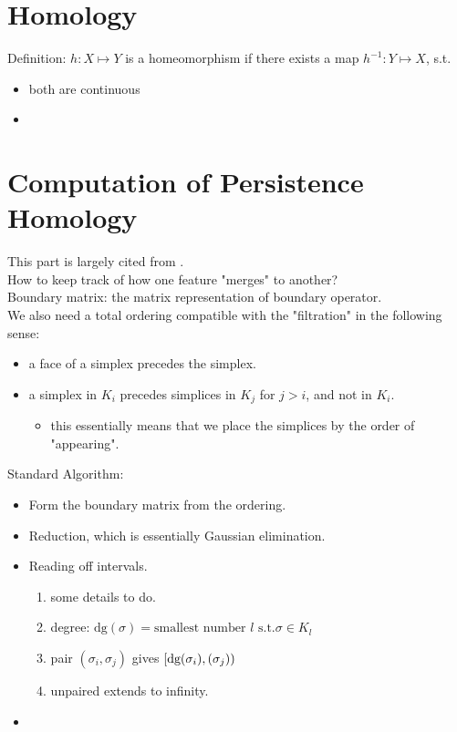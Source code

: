 \documentclass[10pt,a4paper]{article}
\begin{document}
\section{Homology}
Definition: $h:X\mapsto Y$ is a homeomorphism if there exists a map $h^{-1}:Y\mapsto X$, s.t.
\begin{itemize}
	\item both are continuous
	\item
\end{itemize}



\section{Computation of Persistence Homology}
This part is largely cited from \cite{Otter2017}.\\
How to keep track of how one feature "merges" to another?\\
Boundary matrix: the matrix representation of boundary operator.\\
We also need a total ordering compatible with the "filtration" in the following sense:
\begin{itemize}
	\item a face of a simplex precedes the simplex.
	\item a simplex in $K_i$ precedes simplices in $K_j$ for $j>i$, and not in $K_i$.
	\begin{itemize}
		\item this essentially means that we place the simplices by the order of "appearing".
	\end{itemize}
\end{itemize}

Standard Algorithm:
\begin{itemize}
	\item Form the boundary matrix from the ordering.
	\item Reduction, which is essentially Gaussian elimination.
	\item Reading off intervals.
	\begin{enumerate}
		\item some details to do.
		\item degree: $\text{dg}(\sigma)=\text{smallest number }l\text{ s.t.}\sigma\in K_l$
		\item pair $(\sigma_i,\sigma_j)$ gives $[\text{dg}(\sigma_i),\text(\sigma_j))$
		\item unpaired extends to infinity.
	\end{enumerate}
	\item 
\end{itemize}
\end{document}
